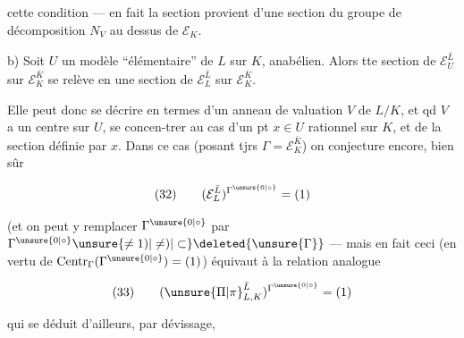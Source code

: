  cette condition --- en fait la section provient d'une section du groupe de décomposition $N_V$ au dessus de $\mathcal E_K$.

\noindent b) Soit $U$ un modèle ``élémentaire'' de $L$ sur $K$, anabélien. Alors tte section de $\mathcal E_U^{\bar L}$ sur $\mathcal E_K^{\bar K}$ se relève en une section de $\mathcal E_L^{\bar L}$ sur $\mathcal E_K^{\bar K}$.

Elle peut donc se décrire en termes d'un anneau de valuation $V$ de $L/K$, et qd $V$ a un centre sur $U$,  se concen-\newline trer au cas d'un pt $x\in U$ rationnel sur $K$, et de la section définie par $x$. Dans ce cas (posant tjrs $\Gamma=\mathcal E_K^{\bar K}$) on conjecture encore, bien sûr

\[
(32)\qquad (\mathcal E_L^{\bar L})^{\Gamma^{\unsure{0|\circ}}}=(1)
\]

(et on peut y remplacer $\Gamma^{\unsure{0|\circ}}$ par $\Gamma^{\unsure{0|\circ}}\unsure{\ne1)|\ne)|\subset}\deleted{\unsure{\Gamma}}$
--- mais en fait ceci (en vertu de $\operatorname{Centr}_\Gamma(\Gamma^{\unsure{0|\circ}})=(1)$) équivaut à la relation analogue 

\[
(33)\qquad (\unsure{\Pi|\pi}_{L,K}^{\bar L})^{\Gamma^{\unsure{0|\circ}}}=(1)
\]

qui se déduit d'ailleurs, par dévissage,

